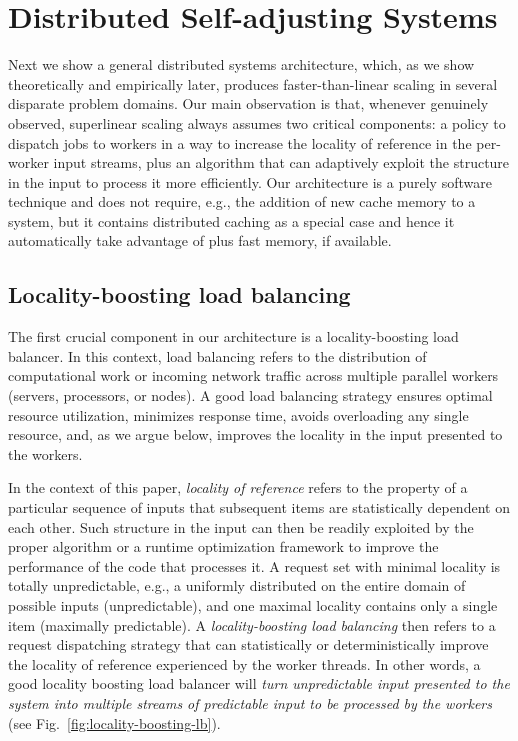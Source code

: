 \section{Distributed Self-adjusting Systems}
\label{sec:architecture}

Next we show a general distributed systems architecture, which, as we show theoretically and empirically later, produces faster-than-linear scaling in several disparate problem domains. Our main observation is that, whenever genuinely observed, superlinear scaling always assumes two critical components: a policy to dispatch jobs to workers in a way to increase the locality of reference in the per-worker input streams, plus an algorithm that can adaptively exploit the structure in the input to process it more efficiently. Our architecture is a purely software technique and does not require, e.g., the addition of new cache memory to a system, but it contains distributed caching as a special case and hence it automatically take advantage of plus fast memory, if available.

\subsection{Locality-boosting load balancing}
\label{sec:lb-lb}

The first crucial component in our architecture is a locality-boosting load balancer.  In this context, load balancing refers to the distribution of computational work or incoming network traffic across multiple parallel workers (servers, processors, or nodes). A good load balancing strategy ensures optimal resource utilization, minimizes response time, avoids overloading any single resource, and, as we argue below, improves the locality in the input presented to the workers. 

In the context of this paper, \emph{locality of reference} refers to the property of a particular sequence of inputs that subsequent items are statistically dependent on each other. Such structure in the input can then be readily exploited by the proper algorithm \cite{SleatorT85Splay, BentleyCL93, HesterH85, HesterH85, BentleySTW86, Avin0020, ParkM12} or a runtime optimization framework \cite{276946,246322,10.1145/3503222.3507769,procieee_2019} to improve the performance of the code that processes it. A request set with minimal locality is totally unpredictable, e.g., a uniformly distributed on the entire domain of possible inputs (unpredictable), and one maximal locality contains only a single item (maximally predictable). A \emph{locality-boosting load balancing} then refers to a request dispatching strategy that can statistically or deterministically improve the locality of reference experienced by the worker threads. In other words, a good locality boosting load balancer will \emph{turn unpredictable input presented to the system into multiple streams of predictable input to be processed by the workers} (see Fig.~\ref{fig:locality-boosting-lb}).

